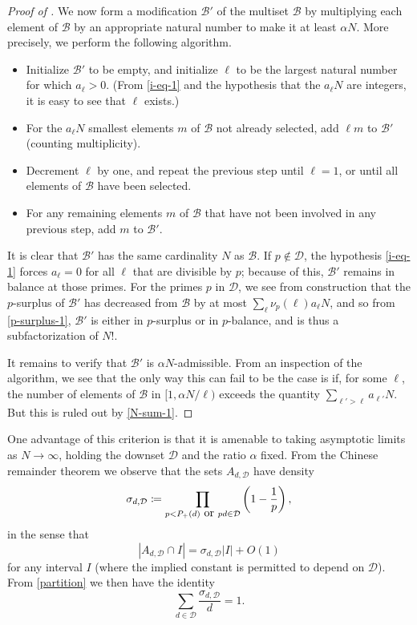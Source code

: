 \documentclass[10pt,a4paper,reqno]{amsart}
\numberwithin{equation}{section}
\theoremstyle{plain}
\theoremstyle{definition}
\newcommand\tuple{{\mathcal B}}
\begin{document}
\begin{proof}[Proof of ]
  We now form a modification $\tuple'$ of the multiset $\tuple$ by multiplying each element of $\tuple$ by an appropriate natural number to make it at least $\alpha N$.  More precisely, we perform the following algorithm.
  \begin{itemize}
    \item Initialize $\tuple'$ to be empty, and initialize $\ell$ to be the largest natural number for which $a_\ell > 0$.  (From \eqref{i-eq-1} and the hypothesis that the $a_\ell N$ are integers, it is easy to see that $\ell$ exists.)
    \item For the $a_\ell N$ smallest elements $m$ of $\tuple$ not already selected, add $\ell m$ to $\tuple'$ (counting multiplicity).
    \item Decrement $\ell$ by one, and repeat the previous step until $\ell=1$, or until all elements of $\tuple$ have been selected.
    \item For any remaining elements $m$ of $\tuple$ that have not been involved in any previous step, add $m$ to $\tuple'$. 
  \end{itemize}
  It is clear that $\tuple'$ has the same cardinality $N$ as $\tuple$.  If $p \not \in {\mathcal D}$, the hypothesis \eqref{i-eq-1} forces $a_\ell=0$ for all $\ell$ that are divisible by $p$; because of this, $\tuple'$ remains in balance at those primes.  For the primes $p$ in ${\mathcal D}$, we see from construction that the $p$-surplus of $\tuple'$ has decreased from $\tuple$ by at most
  $\sum_\ell \nu_p(\ell) a_\ell N$, and so from \eqref{p-surplus-1}, $\tuple'$ is either in $p$-surplus or in $p$-balance, and is thus a subfactorization of $N!$.
  
It remains to verify that $\tuple'$ is $\alpha N$-admissible.  From an inspection of the algorithm, we see that the only way this can fail to be the case is if, for some $\ell$, the number of elements of $\tuple$ in $[1, \alpha N/\ell)$ exceeds the quantity $\sum_{\ell' > \ell} a_{\ell'} N$.  But this is ruled out by \eqref{N-sum-1}.
\end{proof}

One advantage of this criterion is that it is amenable to taking asymptotic limits as $N \to \infty$, holding the downset ${\mathcal D}$ and the ratio $\alpha$ fixed.  From the Chinese remainder theorem we observe that the sets $A_{d,{\mathcal D}}$ have density
$$ \sigma_{d,{\mathcal D}} \coloneqq \prod_{p < P_+(d) \hbox{ or } pd \in {\mathcal D}} \left(1-\frac{1}{p}\right),$$
in the sense that
\begin{equation}\label{crt}
 |A_{d,{\mathcal D}} \cap I| = \sigma_{d,{\mathcal D}} |I| + O(1)
\end{equation}
for any interval $I$ (where the implied constant is permitted to depend on ${\mathcal D}$).  From \eqref{partition} we then have the identity
\begin{equation}\label{sigma-id}
  \sum_{d \in {\mathcal D}} \frac{\sigma_{d,{\mathcal D}}}{d} = 1.
\end{equation}
\end{document}
